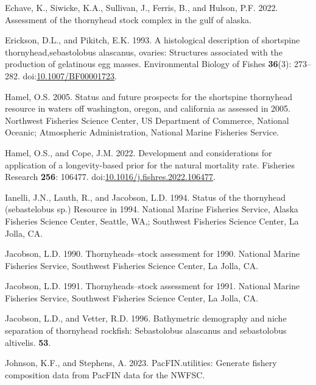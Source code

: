 \documentclass[11pt,
  letterpaper,
]{article}
\newlength{\cslhangindent}
\newenvironment{CSLReferences}[2] %
 {%
  \setlength{\parindent}{0pt}
  \ifodd #1 \everypar{\setlength{\hangindent}{\cslhangindent}}\ignorespaces\fi
  \ifnum #2 > 0
  \setlength{\parskip}{#2\baselineskip}
  \fi
 }%
 {}
\begin{document}
\begin{CSLReferences}{1}{0}
\leavevmode{}%
Echave, K., Siwicke, K.A., Sullivan, J., Ferris, B., and Hulson, P.F. 2022. Assessment of the thornyhead stock complex in the gulf of alaska.

\leavevmode{}%
Erickson, D.L., and Pikitch, E.K. 1993. A histological description of shortspine thornyhead,sebastolobus alascanus, ovaries: Structures associated with the production of gelatinous egg masses. Environmental Biology of Fishes \textbf{36}(3): 273--282. doi:\href{https://doi.org/10.1007/BF00001723}{10.1007/BF00001723}.

\leavevmode{}%
Hamel, O.S. 2005. Status and future prospects for the shortspine thornyhead resource in waters off washington, oregon, and california as assessed in 2005. Northwest Fisheries Science Center, US Department of Commerce, National Oceanic; Atmospheric Administration, National Marine Fisheries Service.

\leavevmode{}%
Hamel, O.S., and Cope, J.M. 2022. Development and considerations for application of a longevity-based prior for the natural mortality rate. Fisheries Research \textbf{256}: 106477. doi:\href{https://doi.org/10.1016/j.fishres.2022.106477}{10.1016/j.fishres.2022.106477}.

\leavevmode{}%
Ianelli, J.N., Lauth, R., and Jacobson, L.D. 1994. Status of the thornyhead (sebastelobus sp.) Resource in 1994. National Marine Fisheries Service, Alaska Fisheries Science Center, Seattle, {WA},; Southwest Fisheries Science Center, La Jolla, {CA}.

\leavevmode{}%
Jacobson, L.D. 1990. Thornyheads--stock assessment for 1990. National Marine Fisheries Service, Southwest Fisheries Science Center, La Jolla, {CA}.

\leavevmode{}%
Jacobson, L.D. 1991. Thornyheads--stock assessment for 1991. National Marine Fisheries Service, Southwest Fisheries Science Center, La Jolla, {CA}.

\leavevmode{}%
Jacobson, L.D., and Vetter, R.D. 1996. Bathymetric demography and niche separation of thornyhead rockfish: Sebastolobus alascanus and sebastolobus altivelis. \textbf{53}.

\leavevmode{}%
Johnson, K.F., and Stephens, A. 2023. PacFIN.utilities: Generate fishery composition data from PacFIN data for the NWFSC.


\end{CSLReferences}
\end{document}
